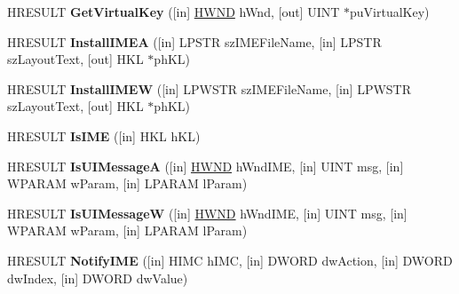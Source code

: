\begin{DoxyCompactItemize}
H\+R\+E\+S\+U\+LT {\bfseries Get\+Virtual\+Key} (\mbox{[}in\mbox{]} \hyperlink{interfacevoid}{H\+W\+ND} h\+Wnd, \mbox{[}out\mbox{]} U\+I\+NT $\ast$pu\+Virtual\+Key)
\item 
\mbox{\label{interface_i_active_i_m_m_app_aaed60fb3921cd2586c146a745cf48169}} 
H\+R\+E\+S\+U\+LT {\bfseries Install\+I\+M\+EA} (\mbox{[}in\mbox{]} L\+P\+S\+TR sz\+I\+M\+E\+File\+Name, \mbox{[}in\mbox{]} L\+P\+S\+TR sz\+Layout\+Text, \mbox{[}out\mbox{]} H\+KL $\ast$ph\+KL)
\item 
\mbox{\label{interface_i_active_i_m_m_app_a3d4833a271ef0f5aa31174f232fa3801}} 
H\+R\+E\+S\+U\+LT {\bfseries Install\+I\+M\+EW} (\mbox{[}in\mbox{]} L\+P\+W\+S\+TR sz\+I\+M\+E\+File\+Name, \mbox{[}in\mbox{]} L\+P\+W\+S\+TR sz\+Layout\+Text, \mbox{[}out\mbox{]} H\+KL $\ast$ph\+KL)
\item 
\mbox{\label{interface_i_active_i_m_m_app_a4398eb66b0bf2f715fa469b8421110a0}} 
H\+R\+E\+S\+U\+LT {\bfseries Is\+I\+ME} (\mbox{[}in\mbox{]} H\+KL h\+KL)
\item 
\mbox{\label{interface_i_active_i_m_m_app_a3754af75cc639e7c4df353ec1715d94c}} 
H\+R\+E\+S\+U\+LT {\bfseries Is\+U\+I\+MessageA} (\mbox{[}in\mbox{]} \hyperlink{interfacevoid}{H\+W\+ND} h\+Wnd\+I\+ME, \mbox{[}in\mbox{]} U\+I\+NT msg, \mbox{[}in\mbox{]} W\+P\+A\+R\+AM w\+Param, \mbox{[}in\mbox{]} L\+P\+A\+R\+AM l\+Param)
\item 
\mbox{\label{interface_i_active_i_m_m_app_a9ee8ed8e0460392e9d6a6d32067c3e2c}} 
H\+R\+E\+S\+U\+LT {\bfseries Is\+U\+I\+MessageW} (\mbox{[}in\mbox{]} \hyperlink{interfacevoid}{H\+W\+ND} h\+Wnd\+I\+ME, \mbox{[}in\mbox{]} U\+I\+NT msg, \mbox{[}in\mbox{]} W\+P\+A\+R\+AM w\+Param, \mbox{[}in\mbox{]} L\+P\+A\+R\+AM l\+Param)
\item 
\mbox{\label{interface_i_active_i_m_m_app_a6f0ec8d9eb4bdadeedf5c555ff89119d}} 
H\+R\+E\+S\+U\+LT {\bfseries Notify\+I\+ME} (\mbox{[}in\mbox{]} H\+I\+MC h\+I\+MC, \mbox{[}in\mbox{]} D\+W\+O\+RD dw\+Action, \mbox{[}in\mbox{]} D\+W\+O\+RD dw\+Index, \mbox{[}in\mbox{]} D\+W\+O\+RD dw\+Value)
\item 
\mbox{\label{interface_i_active_i_m_m_app_a2bf5997f2e1bb37ab7d91a2da09fe0eb}} 

\end{DoxyCompactItemize}
